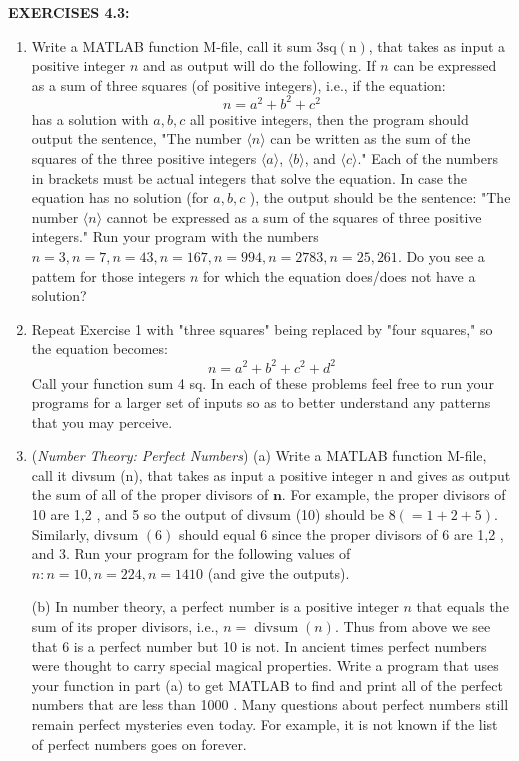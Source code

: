 \documentclass[../main.tex]{subfiles}
\begin{document}
\textbf{EXERCISES 4.3: }
\begin{enumerate}
\item Write a MATLAB function M-file, call it sum $3 \mathrm{sq}(\mathrm{n})$, that takes as input a positive integer $n$ and as output will do the following. If $n$ can be expressed as a sum of three squares (of positive integers), i.e., if the equation:\\

$$
n=a^{2}+b^{2}+c^{2}
$$
has a solution with $a, b, c$ all positive integers, then the program should output the sentence, "The number $\langle n\rangle$ can be written as the sum of the squares of the three positive integers $\langle a\rangle$, $\langle b\rangle$, and $\langle c\rangle$." Each of the numbers in brackets must be actual integers that solve the equation. In case the equation has no solution (for $a, b, c$ ), the output should be the sentence: "The number $\langle n\rangle$ cannot be expressed as a sum of the squares of three positive integers." Run your program with the numbers $n=3, n=7, n=43, n=167, n=994, n=2783, n=25,261$. Do you see a pattem for those integers $n$ for which the equation does/does not have a solution? 
\item Repeat Exercise 1 with "three squares" being replaced by "four squares," so the equation becomes:
$$
n=a^{2}+b^{2}+c^{2}+d^{2}
$$
Call your function sum 4 sq. In each of these problems feel free to run your programs for a larger set of inputs so as to better understand any patterns that you may perceive.

\item (\emph{Number Theory: Perfect Numbers}) (a) Write a MATLAB function M-file, call it divsum (n), that takes as input a positive integer $\mathrm{n}$ and gives as output the sum of all of the proper divisors of $\boldsymbol{n}$. For example, the proper divisors of 10 are 1,2 , and 5 so the output of divsum (10) should be $8(=1+2+5)$. Similarly, divsum $(6)$ should equal 6 since the proper divisors of 6 are 1,2 , and 3. Run your program for the following values of $n: n=10, n=224, n=1410$ (and give the outputs).

(b) In number theory, a perfect number is a positive integer $n$ that equals the sum of its proper divisors, i.e., $n=\operatorname{divsum}(n)$. Thus from above we see that 6 is a perfect number but 10 is not. In ancient times perfect numbers were thought to carry special magical properties. Write a program that uses your function in part (a) to get MATLAB to find and print all of the perfect numbers that are less than 1000 . Many questions about perfect numbers still remain perfect mysteries even today. For example, it is not known if the list of perfect numbers goes on forever.


\end{enumerate}
\end{document}

